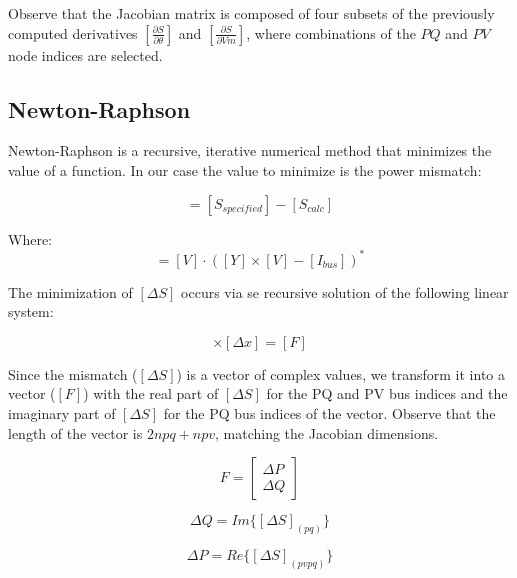 \documentclass[nols,a4paper,twoside,symmetric,notoc,fleqn]{tufte-book}
\begin{document}
Observe that the Jacobian matrix is composed of four subsets of the previously computed derivatives $\left[\frac{\partial S}{\partial \theta}\right]$ and $\left[\frac{\partial S}{\partial Vm}\right]$, where combinations of the $PQ$ and $PV$ node indices are selected.


\newpage
\subsection{Newton-Raphson}

Newton-Raphson is a recursive, iterative numerical method that minimizes the value of a function. In our case the value to minimize is the power mismatch:

\begin{equation}
[\Delta S] = [S_{specified}] - [S_{calc} ]
\end{equation}

Where:
\begin{equation}
[S_{calc}] = [V] \cdot ([Y] \times [V] - [I_{bus}])^*
\label{eq:nr_Scalc}
\end{equation}

The minimization of $[\Delta S]$ occurs via se recursive solution of the following linear system:

\begin{equation}
[J] \times [\Delta x] = [F]
\end{equation}

Since the mismatch ($[\Delta S]$) is a vector of complex values, we transform it into a vector ($[F]$) with the real part of $[\Delta S]$ for the PQ and PV bus indices and the imaginary part of $[\Delta S]$ for the PQ bus indices of the vector. Observe that the length of the vector is $2npq+npv$, matching the Jacobian dimensions.



\begin{equation}
F =  \left[
\begin{array}{c}
\Delta P \\
\Delta Q  
\end{array}
\right]
\label{eq:nr_mismatch}
\end{equation}

\begin{equation}
\Delta Q = Im \{ [\Delta S]_{(pq)} \}
\label{eq:nr_q_inc}
\end{equation}

\begin{equation}
\Delta P = Re \{ [\Delta S]_{(pvpq)}  \} 
\label{eq:nr_p_inc}
\end{equation}
\end{document}
